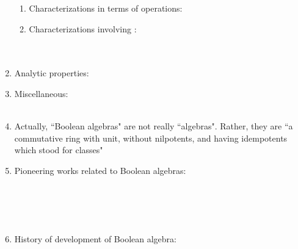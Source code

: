 \begin{survey}
\begin{enumerate}
\begin{enumerate}
      \item Characterizations in terms of  operations:
        \\
      
      \item Characterizations involving :
        \\
        \\
        \\

    \end{enumerate}

  \item Analytic properties:
    \\

  \item Miscellaneous:
    \\
    \\

  \item Actually, ``Boolean algebras" are not really ``algebras". Rather, they are
    ``a commutative ring with unit, without nilpotents, and having idempotents which stood for classes"
    \\

  \item Pioneering works related to Boolean algebras:
    \\
    \\
    \\
    \\
    \\

  \item History of development of Boolean algebra:
    \\

\end{enumerate}
\end{survey}



